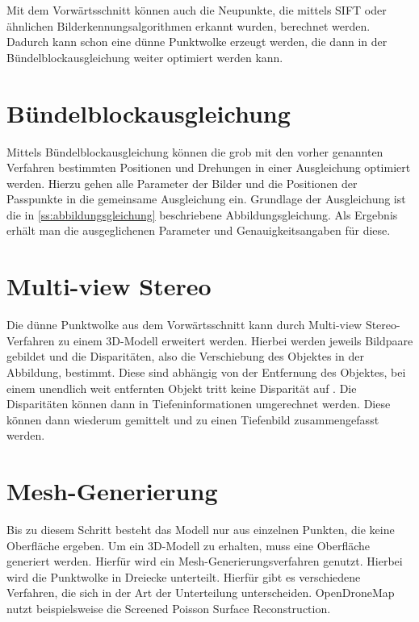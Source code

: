 \documentclass[./00PhotoBox.tex]{subfiles}
\begin{document}
Mit dem Vorwärts\-schnitt können auch die Neupunkte, die mittels SIFT oder ähnlichen Bild\-erkennungs\-algorithmen erkannt wurden, berechnet werden. Dadurch kann schon eine dünne Punktwolke erzeugt werden, die dann in der Bündel\-block\-ausgleichung weiter optimiert werden kann.


\section{Bündelblockausgleichung}
\label{s:buendelblock}
Mittels Bündelblockausgleichung können die grob mit den vorher genannten Verfahren bestimmten Positionen und Drehungen in einer Ausgleichung optimiert werden. Hierzu gehen alle Parameter der Bilder und die Positionen der Passpunkte in die gemeinsame Ausgleichung ein. Grundlage der Ausgleichung ist die in \autoref{ss:abbildungsgleichung} beschriebene Abbildungsgleichung. Als Ergebnis erhält man die ausgeglichenen Parameter und Genauigkeitsangaben für diese. \citep[S. 343ff]{luhmann}


\section{Multi-view Stereo}
Die dünne Punktwolke aus dem Vorwärtsschnitt kann durch Multi-view Stereo-Verfahren zu einem 3D-Modell erweitert werden. Hierbei werden jeweils Bildpaare gebildet und die Disparitäten, also die Verschiebung des Objektes in der Abbildung, bestimmt. Diese sind abhängig von der Entfernung des Objektes, bei einem unendlich weit entfernten Objekt tritt keine Disparität auf \citep[S. 313]{luhmann}. Die Disparitäten können dann in Tiefeninformationen umgerechnet werden. Diese können dann wiederum gemittelt und zu einen Tiefenbild zusammengefasst werden. \citep[S. 505]{luhmann}

\section{Mesh-Generierung}
Bis zu diesem Schritt besteht das Modell nur aus einzelnen Punkten, die keine Oberfläche ergeben. Um ein 3D-Modell zu erhalten, muss eine Oberfläche generiert werden. Hierfür wird ein Mesh-Generierungsverfahren genutzt. Hierbei wird die Punktwolke in Dreiecke unterteilt. Hierfür gibt es verschiedene Verfahren, die sich in der Art der Unterteilung unterscheiden. OpenDroneMap nutzt beispielsweise die Screened Poisson Surface Reconstruction. \citep[S. 52f]{opendronemap}
\end{document}
